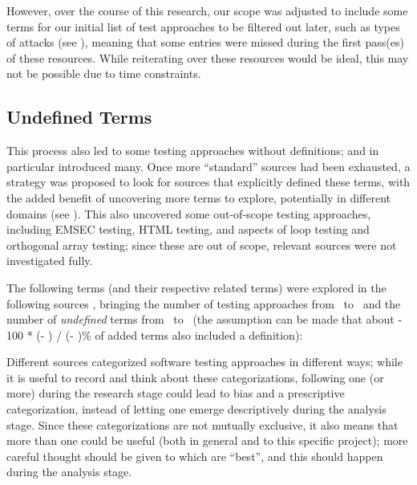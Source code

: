 However, over the course of this research, our scope was adjusted to include
some terms for our initial list of test approaches to be filtered out later,
such as types of attacks (see ), meaning that some entries
were missed during the first pass(es) of these resources. While reiterating
over these resources would be ideal, this may not be possible due to time
constraints.

\subsection{Undefined Terms}
\label{undef-terms}


\newcount\TotalBefore
\newcount\TotalAfter
\newcount\UndefBefore
\newcount\UndefAfter



This process also led to some testing approaches without definitions;
\citep{IEEE2022} and \citep{Firesmith2015} in particular introduced many.
Once more ``standard'' sources had been exhausted, a strategy was proposed to
look for sources that explicitly defined these terms, with the added benefit of
uncovering more terms to explore, potentially in different domains (see
). This also uncovered some out-of-scope testing approaches,
including EMSEC testing, HTML testing, and aspects of loop testing and
orthogonal array testing; since these
are out of scope, relevant sources were not investigated fully.

The following terms (and their respective related terms)
were explored%
\ifnotpaper
      { in the following sources}%
\fi, bringing the number of testing
approaches from \the\TotalBefore~to \the\TotalAfter~and the number of
\emph{undefined} terms from \the\UndefBefore~to \the\UndefAfter~(the assumption
can be made that about \the{} - 100 * (\UndefAfter - \UndefBefore) /
(\TotalAfter - \TotalBefore)\relax\% of added terms also included a definition):



Different sources categorized software testing approaches in different ways;
while it is useful to record and think about these
categorizations, following one (or more)
during the research
stage could lead to bias and a prescriptive categorization, instead of letting
one emerge descriptively during the analysis stage. Since these categorizations
are not mutually exclusive, it also means that more than one could be useful
(both in general and to this specific project); more careful thought should be
given to which are ``best'', and this should happen during the analysis stage.
